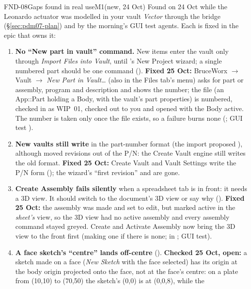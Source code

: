 \begin{epic}{FND-08}{Gaps found in real use}{M1}{\stTodo}{(new, 24 Oct)}
Found on 24 Oct while the Leonardo actuator was modelled in your vault \emph{Vector} through the bridge
(\S\ref{sec:pdm07-plan}) and by the morning's GUI test agents. Each is fixed in the epic that owns it:
\begin{enumerate}[nosep]
  \item \textbf{No ``New part in vault'' command.} New items enter the vault only through \emph{Import Files into
        Vault}, until 's New Project wizard; a single numbered part should be one command
        (). \textbf{Fixed 25 Oct:} BruceWorx $\rightarrow$ Vault $\rightarrow$ \emph{New Part in Vault\ldots}
        (also in the Files tab's menu) asks for part or assembly, program and description and shows the number; the
        file (an App::Part holding a Body, with the vault's part properties) is numbered, checked in as WIP~01,
        checked out to you and opened with the Body active. The number is taken only once the file exists, so a
        failure burns none (; GUI test ).
  \item \textbf{New vaults still write } in the part-number format (the import proposed
        ), although  moved revisions out of the P/N: the Create Vault engine
        still writes the old format. \textbf{Fixed 25 Oct:} Create Vault and Vault Settings write the P/N form
        (); the wizard's ``first revision'' and  are gone.
  \item \textbf{Create Assembly fails silently} when a spreadsheet tab is in front: it needs a 3D view. It should
        switch to the document's 3D view or say why (). \textbf{Fixed 25 Oct:} the assembly was made
        and set to edit, but marked active in the \emph{sheet's} view, so the 3D view had no active assembly and every
        assembly command stayed greyed. Create and Activate Assembly now bring the 3D view to the front first
        (making one if there is none; \code{[BW]} in ; GUI test).
  \item \textbf{A face sketch's ``centre'' lands off-centre} (). \textbf{Checked 25 Oct, open:} a sketch
        made on a face (\emph{New Sketch} with the face selected) has its origin at the body origin projected onto the
        face, not at the face's centre: on a plate from (10,10) to (70,50) the sketch's (0,0) is at (0,0,8), while the

\end{enumerate}
\end{epic}
